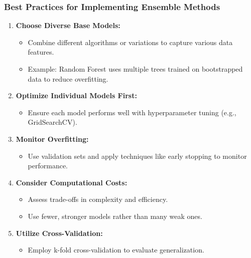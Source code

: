 \documentclass[aspectratio=169]{beamer}
\begin{document}
\begin{frame}
    \frametitle{Best Practices for Implementing Ensemble Methods}
    \begin{enumerate}
        \item \textbf{Choose Diverse Base Models:}
            \begin{itemize}
                \item Combine different algorithms or variations to capture various data features.
                \item Example: Random Forest uses multiple trees trained on bootstrapped data to reduce overfitting.
            \end{itemize}
        
        \item \textbf{Optimize Individual Models First:}
            \begin{itemize}
                \item Ensure each model performs well with hyperparameter tuning (e.g., GridSearchCV).
            \end{itemize}

        \item \textbf{Monitor Overfitting:}
            \begin{itemize}
                \item Use validation sets and apply techniques like early stopping to monitor performance.
            \end{itemize}

        \item \textbf{Consider Computational Costs:}
            \begin{itemize}
                \item Assess trade-offs in complexity and efficiency.
                \item Use fewer, stronger models rather than many weak ones.
            \end{itemize}

        \item \textbf{Utilize Cross-Validation:}
            \begin{itemize}
                \item Employ k-fold cross-validation to evaluate generalization.
            \end{itemize}
    \end{enumerate}
\end{frame}
\end{document}
